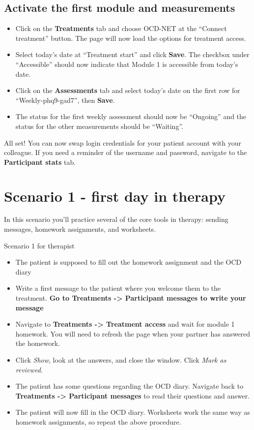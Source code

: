 \documentclass[]{book}
\providecommand{\tightlist}{%
  \setlength{\itemsep}{0pt}\setlength{\parskip}{0pt}}
\begin{document}
\hypertarget{activate-the-first-module-and-measurements}{%
\subsection{Activate the first module and measurements}\label{activate-the-first-module-and-measurements}}

\begin{itemize}
\tightlist
\item
  Click on the \textbf{Treatments} tab and choose OCD-NET at the ``Connect treatment'' button. The page will now load the options for treatment access.
\item
  Select today's date at ``Treatment start'' and click \textbf{Save}. The checkbox under ``Accessible'' should now indicate that Module 1 is accessible from today's date.
\item
  Click on the \textbf{Assessments} tab and select today's date on the first row for ``Weekly-phq9-gad7'', then \textbf{Save}.
\item
  The status for the first weekly assessment should now be ``Ongoing'' and the status for the other measurements should be ``Waiting''.
\end{itemize}

All set! You can now swap login credentials for your patient account with your colleague. If you need a reminder of the username and password, navigate to the \textbf{Participant stats} tab.

\hypertarget{scenario-1---first-day-in-therapy}{%
\section{Scenario 1 - first day in therapy}\label{scenario-1---first-day-in-therapy}}

In this scenario you'll practice several of the core tools in therapy: sending messages, homework assignments, and worksheets.

 Scenario 1 for therapist

\begin{itemize}
\tightlist
\item
  The patient is supposed to fill out the homework assignment and the OCD diary
\item
  Write a first message to the patient where you welcome them to the treatment. \textbf{Go to Treatments -\textgreater{} Participant messages to write your message}
\item
  Navigate to \textbf{Treatments -\textgreater{} Treatment access} and wait for module 1 homework. You will need to refresh the page when your partner has answered the homework.
\item
  Click \emph{Show}, look at the answers, and close the window. Click \emph{Mark as reviewed}.
\item
  The patient has some questions regarding the OCD diary. Navigate back to \textbf{Treatments -\textgreater{} Participant messages} to read their questions and answer.
\item
  The patient will now fill in the OCD diary. Worksheets work the same way as homework assignments, so repeat the above procedure.
\end{itemize}
\end{document}
